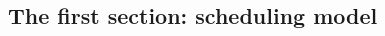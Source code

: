 \documentclass[a4paper,10pt]{article}
\begin{document}
\begin{multicols}{2}
\section{The first section: scheduling model}








\end{multicols}
\end{document}
